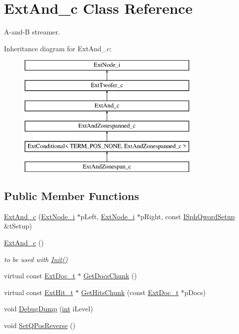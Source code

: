 \hypertarget{classExtAnd__c}{\section{Ext\-And\-\_\-c Class Reference}
\label{classExtAnd__c}
}


A-\/and-\/\-B streamer.  


Inheritance diagram for Ext\-And\-\_\-c\-:\begin{figure}[H]
\begin{center}
\leavevmode
\includegraphics[height=6.000000cm]{classExtAnd__c}
\end{center}
\end{figure}
\subsection*{Public Member Functions}
\begin{DoxyCompactItemize}
\item 
\hyperlink{classExtAnd__c_a4d6611ca9f76c2d9fcce59f4b0ef41cd}{Ext\-And\-\_\-c} (\hyperlink{classExtNode__i}{Ext\-Node\-\_\-i} $\ast$p\-Left, \hyperlink{classExtNode__i}{Ext\-Node\-\_\-i} $\ast$p\-Right, const \hyperlink{classISphQwordSetup}{I\-Sph\-Qword\-Setup} \&t\-Setup)
\item 
\hyperlink{classExtAnd__c_a4e8a62a73f0b8d4cf12ee65c456e6bd6}{Ext\-And\-\_\-c} ()
\begin{DoxyCompactList}\small\item\em to be used with \hyperlink{classExtTwofer__c_a626b6563aa5f26837a50534f1609ad83}{Init()} \end{DoxyCompactList}\item 
virtual const \hyperlink{structExtDoc__t}{Ext\-Doc\-\_\-t} $\ast$ \hyperlink{classExtAnd__c_abe5b86dbf76f26647ae28c106e3888a6}{Get\-Docs\-Chunk} ()
\item 
virtual const \hyperlink{structExtHit__t}{Ext\-Hit\-\_\-t} $\ast$ \hyperlink{classExtAnd__c_a7adcf202720f1d7be30e34b8a31f882c}{Get\-Hits\-Chunk} (const \hyperlink{structExtDoc__t}{Ext\-Doc\-\_\-t} $\ast$p\-Docs)
\item 
void \hyperlink{classExtAnd__c_a43aa2ce549b918e70fc35cb219dd92b3}{Debug\-Dump} (\hyperlink{sphinxexpr_8cpp_a4a26e8f9cb8b736e0c4cbf4d16de985e}{int} i\-Level)
\item 
void \hyperlink{classExtAnd__c_a8613af44c346d44a1afcd198bcf93ad5}{Set\-Q\-Pos\-Reverse} ()
\end{DoxyCompactItemize}
